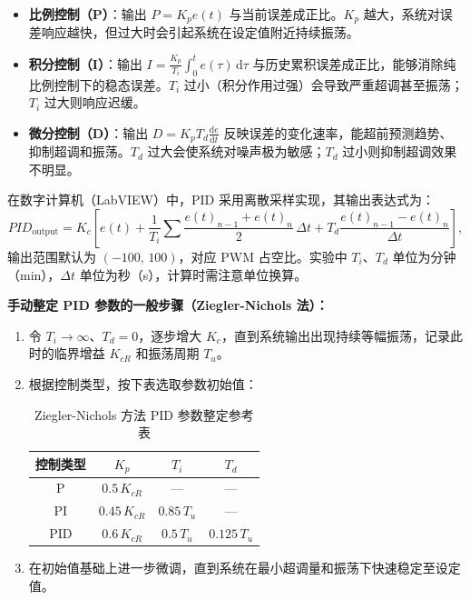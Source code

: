 \documentclass[dvipsnames, svgnames,a4paper,11pt]{article}
\begin{document}
\begin{itemize}
	\item \textbf{比例控制（P）}：输出 $P = K_p e(t)$ 与当前误差成正比。$K_p$ 越大，系统对误差响应越快，但过大时会引起系统在设定值附近持续振荡。
	\item \textbf{积分控制（I）}：输出 $I = \frac{K_p}{T_i}\int_0^t e(\tau)\,\mathrm{d}\tau$ 与历史累积误差成正比，能够消除纯比例控制下的稳态误差。$T_i$ 过小（积分作用过强）会导致严重超调甚至振荡；$T_i$ 过大则响应迟缓。
	\item \textbf{微分控制（D）}：输出 $D = K_p T_d\frac{\mathrm{d}e}{\mathrm{d}t}$ 反映误差的变化速率，能超前预测趋势、抑制超调和振荡。$T_d$ 过大会使系统对噪声极为敏感；$T_d$ 过小则抑制超调效果不明显。
\end{itemize}

在数字计算机（LabVIEW）中，PID 采用离散采样实现，其输出表达式为：
\begin{equation}
	\mathit{PID}_\mathrm{output} = K_c\!\left[e(t) + \frac{1}{T_i}\sum\frac{e(t)_{n-1}+e(t)_n}{2}\,\Delta t + T_d\frac{e(t)_{n-1}-e(t)_n}{\Delta t}\right],
\end{equation}
输出范围默认为 $(-100,\,100)$，对应 PWM 占空比。实验中 $T_i$、$T_d$ 单位为分钟（min），$\Delta t$ 单位为秒（s），计算时需注意单位换算。

\textbf{手动整定 PID 参数的一般步骤（Ziegler-Nichols 法）：}
\begin{enumerate}
	\item 令 $T_i\to\infty$、$T_d=0$，逐步增大 $K_c$，直到系统输出出现持续等幅振荡，记录此时的临界增益 $K_{cR}$ 和振荡周期 $T_u$。
	\item 根据控制类型，按下表选取参数初始值：

	\begin{table}[H]
		\centering
		\renewcommand\arraystretch{1.5}
		\begin{tabular}{|c|c|c|c|}
		\hline
		控制类型 & $K_p$ & $T_i$ & $T_d$ \\
		\hline
		P   & $0.5\,K_{cR}$  & —               & — \\
		PI  & $0.45\,K_{cR}$ & $0.85\,T_u$     & — \\
		PID & $0.6\,K_{cR}$  & $0.5\,T_u$      & $0.125\,T_u$ \\
		\hline
		\end{tabular}
		\caption{Ziegler-Nichols 方法 PID 参数整定参考表}
	\end{table}

	\item 在初始值基础上进一步微调，直到系统在最小超调量和振荡下快速稳定至设定值。
\end{enumerate}
\end{document}
